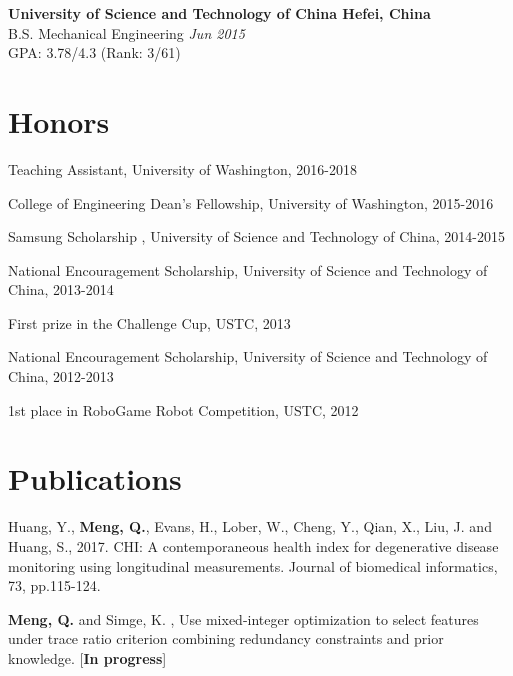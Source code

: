 \documentclass[margin,line,11pt]{resume}
\begin{document}
\begin{resume}
 \textbf{University of Science and Technology of China \hfill Hefei, China}\\
 B.S. \quad Mechanical Engineering \hfill \textit{Jun 2015}\\
 GPA: 3.78/4.3 (Rank: 3/61)
           

 
     


        \section{\mysidestyle Honors}
        \begin{list2}
        \item {Teaching Assistant, University of Washington, 2016-2018}
                \item {College of Engineering Dean's Fellowship, University of Washington, 2015-2016}          
        \item {Samsung Scholarship , University of Science and Technology of China, 2014-2015}
        \item {National Encouragement Scholarship, University of Science and Technology of China, 2013-2014}
        \item {First prize in the Challenge Cup, USTC, 2013}          
        \item {National Encouragement Scholarship, University of Science and Technology of China, 2012-2013}          
        \item {1st place in RoboGame Robot Competition, USTC, 2012}
        \end{list2}

        \section{\mysidestyle Publications}
        Huang, Y., \textbf{Meng, Q.}, Evans, H., Lober, W., Cheng, Y., Qian, X., Liu, J. and Huang, S., 2017. CHI: A contemporaneous health index for degenerative disease monitoring using longitudinal measurements. Journal of biomedical informatics, 73, pp.115-124.\par
       \textbf{Meng, Q.} and Simge, K. , Use mixed-integer optimization to select features under trace ratio criterion combining redundancy constraints and prior knowledge. [\textbf{In progress}]
        

\end{resume}
\end{document}
